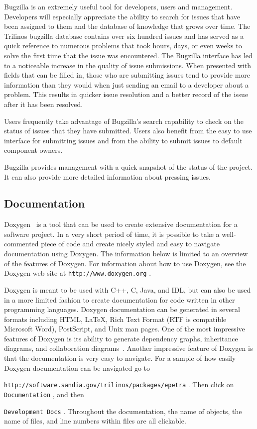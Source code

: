 \documentclass[12pt,relax]{article}
\newcommand{\InlineDirectory}[1]{
  {\hspace{0.01 in}} {\tt #1} {\hspace{0.01 in}}}
\begin{document}

Bugzilla is an extremely useful tool for developers, users and management.  
Developers will especially appreciate the ability to search for issues 
that have been assigned to them and the database of knowledge that grows over
time.  The Trilinos bugzilla database contains over six hundred issues and 
has served as a quick reference to numerous problems that took hours, days, 
or even weeks to solve the first time that the issue was encountered.  The 
Bugzilla interface has led to a noticeable increase in the quality of 
issue submissions.  When presented with fields that can be filled in, those 
who are 
submitting issues tend to provide more information than they would when just 
sending an email to a developer about a problem.  This results in quicker 
issue resolution and a better record of the issue after it has been resolved.  

Users frequently take advantage of Bugzilla's search capability to check on 
the status of issues that they have submitted.  Users also benefit from the 
easy to use interface for submitting issues and from the ability to submit 
issues to default component owners.  

Bugzilla provides management with a quick snapshot of the status of the 
project.  It can also provide more detailed information about pressing issues.

\subsection{Documentation}

Doxygen~\cite{Doxygen} is a tool that can be used to create 
extensive documentation for a software project.  In a very short period of 
time, it is possible to take a well-commented piece 
of code and create nicely styled and easy to navigate documentation using 
Doxygen.  The information below is limited 
to an overview of the features of Doxygen.  For information about how to use 
Doxygen, see the Doxygen 
web site at \InlineDirectory{http://www.doxygen.org}.  

Doxygen is meant to be used with C++, C, Java, and IDL, but can also be used 
in a more limited fashion to create documentation for code written in other
programming languages.  Doxygen documentation 
can be generated in several formats including HTML, \LaTeX, Rich Text Format 
(RTF is compatible Microsoft Word), PostScript, and
Unix man pages.  One of the most impressive features of Doxygen is its ability 
to generate dependency graphs, inheritance diagrams, and collaboration 
diagrams~\cite{Doxygen}.  Another impressive feature of Doxygen is that the 
documentation is very easy to navigate.  For a sample of how easily Doxygen 
documentation can be navigated go to
\newline
\InlineDirectory{http://software.sandia.gov/trilinos/packages/epetra}.  Then
click on \InlineDirectory{Documentation}, and then 
\InlineDirectory{Development Docs}. 
Throughout the documentation, the name of objects, 
the name of files, and line numbers within files are all clickable.
\end{document}
